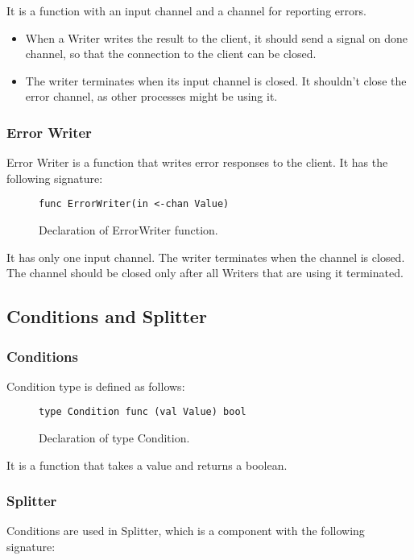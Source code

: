 \documentclass[12pt,a4paper]{article}
\begin{document}
It is a function with an input channel and a channel for reporting errors.
\begin{itemize}
	\item When a Writer writes the result to the client, it should send a signal
		  on done channel, so that the connection to the client can be closed.
	\item The writer terminates when its input channel is closed. It shouldn't
		  close the error channel, as other processes might be using it.
\end{itemize}

\subsubsection{Error Writer}
Error Writer is a function that writes error responses to the client.
It has the following signature:

\begin{figure}[h]
\centering
\begin{lstlisting}
func ErrorWriter(in <-chan Value)
\end{lstlisting}
\caption[scale=1.0]{Declaration of ErrorWriter function.}
\label{fig:ErrorWriter}
\end{figure}

It has only one input channel. The writer terminates when the channel
is closed. The channel should be closed only after all Writers that 
are using it terminated.

\subsection{Conditions and Splitter}
\subsubsection{Conditions}
Condition type is defined as follows:

\begin{figure}[h]
\centering
\begin{lstlisting}
type Condition func (val Value) bool
\end{lstlisting}
\caption[scale=1.0]{Declaration of type Condition.}
\label{fig:Condition}
\end{figure}

It is a function that takes a value and returns a boolean.

\subsubsection{Splitter}
Conditions are used in Splitter, which is a component with the 
following signature:
\end{document}
